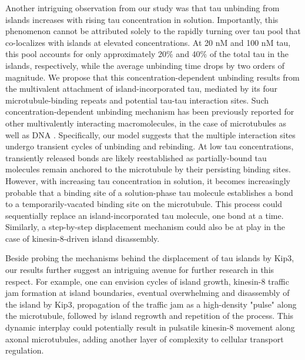 Another intriguing observation from our study was that tau unbinding from islands increases with rising tau concentration in solution. Importantly, this phenomenon cannot be attributed solely to the rapidly turning over tau pool that co-localizes with islands at elevated concentrations. At 20 nM and 100 nM tau, this pool accounts for only approximately 20\% and 40\% of the total tau in the islands, respectively, while the average unbinding time drops by two orders of magnitude. We propose that this concentration-dependent unbinding results from the multivalent attachment of island-incorporated tau, mediated by its four microtubule-binding repeats and potential tau-tau interaction sites. Such concentration-dependent unbinding mechanism has been previously reported for other multivalently interacting macromolecules, in the case of microtubules as well as DNA \parencite{lanskydiffusible2015, sing2014multiple}. Specifically, our model suggests that the multiple interaction sites undergo transient cycles of unbinding and rebinding. At low tau concentrations, transiently released bonds are likely reestablished as partially-bound tau molecules remain anchored to the microtubule by their persisting binding sites. However, with increasing tau concentration in solution, it becomes increasingly probable that a binding site of a solution-phase tau molecule establishes a bond to a temporarily-vacated binding site on the microtubule. This process could sequentially replace an island-incorporated tau molecule, one bond at a time. Similarly, a step-by-step displacement mechanism could also be at play in the case of kinesin-8-driven island disassembly.

Beside probing the mechanisms behind the displacement of tau islands by Kip3, our results further suggest an intriguing avenue for further research in this respect. For example, one can envision cycles of island growth, kinesin-8 traffic jam formation at island boundaries, eventual overwhelming and disassembly of the island by Kip3, propagation of the traffic jam as a high-density "pulse" along the microtubule, followed by island regrowth and repetition of the process. This dynamic interplay could potentially result in pulsatile kinesin-8 movement along axonal microtubules, adding another layer of complexity to cellular transport regulation.\par


